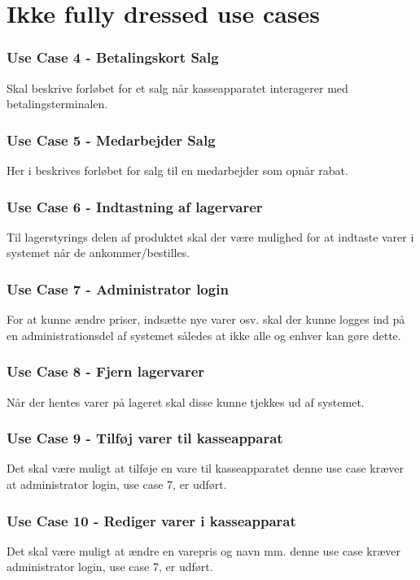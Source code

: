 \section{Ikke fully dressed use cases}

\subsubsection*{Use Case 4 - Betalingskort Salg}
Skal beskrive forløbet for et salg når kasseapparatet interagerer med betalingsterminalen.

\subsubsection*{Use Case 5 - Medarbejder Salg}
Her i beskrives forløbet for salg til en medarbejder som opnår rabat.

\subsubsection*{Use Case 6 - Indtastning af lagervarer}
Til lagerstyrings delen af produktet skal der være mulighed for at indtaste varer i systemet når de ankommer/bestilles.

\subsubsection*{Use Case 7 - Administrator login}
For at kunne ændre priser, indsætte nye varer osv. skal der kunne logges ind på en administrationsdel af systemet således at ikke alle og enhver kan gøre dette.

\subsubsection*{Use Case 8 - Fjern lagervarer}
Når der hentes varer på lageret skal disse kunne tjekkes ud af systemet.

\subsubsection*{Use Case 9 - Tilføj varer til kasseapparat}
Det skal være muligt at tilføje en vare til kasseapparatet denne use case kræver at administrator login, use case 7, er udført.

\subsubsection*{Use Case 10 - Rediger varer i kasseapparat}
Det skal være muligt at ændre en varepris og navn mm. denne use case kræver administrator login, use case 7, er udført.

